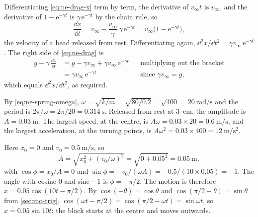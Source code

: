 Differentiating \cref{eq:ne-drag-x} term by
term, the derivative of $v_\infty t$ is $v_\infty$, and the derivative of
$1 - \mathrm{e}^{-\gamma t}$ is $\gamma\,\mathrm{e}^{-\gamma t}$ by the
chain rule, so
\begin{equation*}
   \frac{\dd x}{\dd t} = v_\infty - \frac{v_\infty}{\gamma}\,
   \gamma\,\mathrm{e}^{-\gamma t} = v_\infty\bigl(1 - \mathrm{e}^{-\gamma
   t}\bigr) ,
\end{equation*}
the velocity of a bead released from rest. Differentiating again,
$\dd^2 x/\dd t^2 = \gamma v_\infty\,\mathrm{e}^{-\gamma t}$. The right
side of \cref{eq:ne-drag} is
\begin{align*}
   g - \gamma\,\frac{\dd x}{\dd t}
   &= g - \gamma v_\infty + \gamma v_\infty\,\mathrm{e}^{-\gamma t}
      && \text{multiplying out the bracket}\\
   &= \gamma v_\infty\,\mathrm{e}^{-\gamma t}
      && \text{since $\gamma v_\infty = g$,}
\end{align*}
which equals $\dd^2 x/\dd t^2$, as required.

By \cref{eq:ne-spring-omega}, $\omega =
\sqrt{k/m} = \sqrt{80/0.2} = \sqrt{400} = \SI{20}{\radian\per\second}$ and
the period is $2\pi/\omega = 2\pi/20 = \SI{0.314}{\second}$. Released from
rest at \SI{3}{\centi\metre}, the amplitude is $A = \SI{0.03}{\metre}$.
The largest speed, at the centre, is $A\omega = 0.03\times20 =
\SI{0.6}{\metre\per\second}$, and the largest acceleration, at the turning
points, is $A\omega^2 = 0.03\times400 = \SI{12}{\metre\per\second
\squared}$.

Here $x_0 = 0$ and $v_0 = \SI{0.5}{\metre\per
\second}$, so
\begin{equation*}
   A = \sqrt{x_0^2 + (v_0/\omega)^2} = \sqrt{0 + 0.05^2}
   = \SI{0.05}{\metre} ,
\end{equation*}
with $\cos\phi = x_0/A = 0$ and $\sin\phi = -v_0/(\omega A) =
-0.5/(10\times0.05) = -1$. The angle with cosine 0 and sine $-1$ is $\phi =
-\pi/2$. The motion is therefore $x = 0.05\cos(10t - \pi/2)$. By
$\cos(-\theta) = \cos\theta$ and $\cos(\pi/2 - \theta) = \sin\theta$ from
\cref{sec:mo-trig}, $\cos(\omega t - \pi/2) = \cos(\pi/2 - \omega t) =
\sin\omega t$, so $x = 0.05\sin 10t$: the block starts at the centre and
moves outwards.

